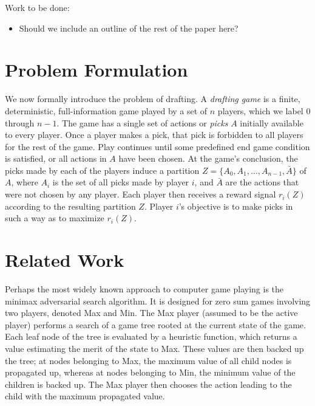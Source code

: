 \documentclass[letterpaper]{article}
\numberwithin{equation}{section}
\numberwithin{theorem}{section}
\numberwithin{lemma}{section}
\numberwithin{df}{section}
\begin{document}

Work to be done:
\begin{itemize}
	\item Should we include an outline of the rest of the paper here?
\end{itemize}

\section{Problem Formulation}
\label{sec:Prob}


We now formally introduce the problem of drafting.  A \emph{drafting game} is a finite, deterministic, full-information game played by a set of $n$ players, which we label 0 through $n-1$.  The game has a single set of actions or \emph{picks} $A$ initially available to every player.  Once a player makes a pick, that pick is forbidden to all players for the rest of the game.  Play continues until some predefined end game condition is satisfied, or all actions in $A$ have been chosen.  At the game's conclusion, the picks made by each of the players induce a partition $Z = \{A_0, A_1, ..., A_{n-1}, \bar{A}\}$ of $A$, where $A_i$ is the set of all picks made by player $i$, and $\bar{A}$ are the actions that were not chosen by any player.  Each player then receives a reward signal $r_i(Z)$ according to the resulting partition $Z$.  Player $i$'s objective is to make picks in such a way as to maximize $r_i(Z)$.


\section{Related Work}

Perhaps the most widely known approach to computer game playing is the minimax adversarial search algorithm.  It is designed for zero sum games involving two players, denoted Max and Min.  The Max player (assumed to be the active player) performs a search of a game tree rooted at the current state of the game.  Each leaf node of the tree is evaluated by a heuristic function, which returns a value estimating the merit of the state to Max.  These values are then backed up the tree; at nodes belonging to Max, the maximum value of all child nodes is propagated up, whereas at nodes belonging to Min, the minimum value of the children is backed up.  The Max player then chooses the action leading to the child with the maximum propagated value.
\end{document}
